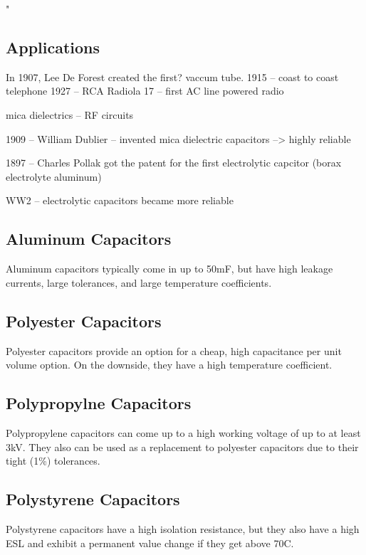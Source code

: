 "
\cite{capSite_intro}

\subsection{Applications}

In 1907, Lee De Forest created the first? vaccum tube. \cite{deis_hist}
1915 -- coast to coast telephone
1927 -- RCA Radiola 17 -- first AC line powered radio

mica dielectrics -- RF circuits

1909 -- William Dublier -- invented mica dielectric capacitors
--> highly reliable

1897 -- Charles Pollak got the patent for the first electrolytic capcitor (borax electrolyte aluminum)

WW2 -- electrolytic capacitors became more reliable

\subsection{Aluminum Capacitors}

Aluminum capacitors typically come in up to 50mF, but have high leakage currents, large tolerances, and large temperature coefficients. \cite{learn_caps}

\subsection{Polyester Capacitors}

Polyester capacitors provide an option for a cheap, high capacitance per unit volume option. On the downside, they have a high temperature coefficient. \cite{learn_caps}

\subsection{Polypropylne Capacitors}

Polypropylene capacitors can come up to a high working voltage of up to at least 3kV. They also can be used as a replacement to polyester capacitors due to their tight (1\%) tolerances.\cite{learn_caps}

\subsection{Polystyrene Capacitors}

Polystyrene capacitors have a high isolation resistance, but they also have a high ESL and exhibit a permanent value change if they get above 70C.
\cite{learn_caps}

